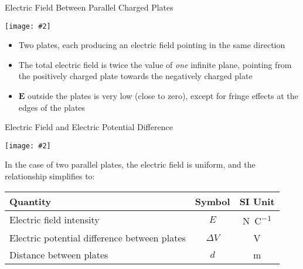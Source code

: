 \documentclass[12pt,aspectratio=169]{beamer}
\newcommand{\pic}[2]{\texttt{[image: \#2]}}
\newcommand{\mb}[1]{\mathbf{#1}}
\newcommand{\eq}[2]{\vspace{#1}{
    \Large\begin{displaymath}#2\end{displaymath}}
}
\begin{document}
\begin{frame}{Electric Field Between Parallel Charged Plates}
  \begin{center}
    \pic{.5}{elfield-600x205.png}
  \end{center}
  \begin{itemize}
  \item\vspace{-.15in}Two plates, each producing an electric field pointing in
    the same direction
  \item The total electric field is twice the value of \emph{one} infinite
    plane, pointing from the positively charged plate towards the negatively
    charged plate

    \eq{-.2in}{
      \boxed{E=\frac{\sigma}{\epsilon_0}}
    }
  \item $\mb{E}$ outside the plates is very low (close to zero), except for
    fringe effects at the edges of the plates
  \end{itemize}
\end{frame}



%    
%
%



\begin{frame}{Electric Field and Electric Potential Difference}
  \begin{center}
    \pic{.4}{elfield-600x205.png}
  \end{center}
  \vspace{-.1in}In the case of two parallel plates, the electric field is
  uniform, and the relationship simplifies to:

  \eq{-.2in}{
    \boxed{E=\frac{\Delta V}{d}}
  }
  \begin{center}
    \begin{tabular}{l|c|c}
      \rowcolor{pink}
      \textbf{Quantity} & \textbf{Symbol} & \textbf{SI Unit} \\ \hline
      Electric field intensity & $E$ & \si{\newton\per\coulomb}\\
      Electric potential difference between plates & $\Delta V$ &
      \si{\volt} \\
      Distance between plates       & $d$ & \si{\metre}
    \end{tabular}
  \end{center}
\end{frame}
\end{document}
